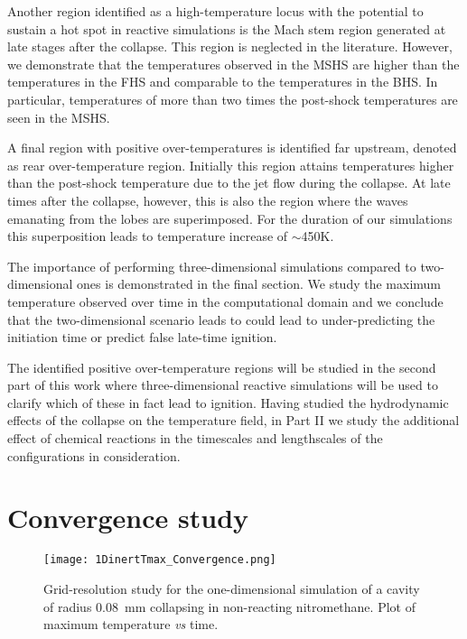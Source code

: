\documentclass[3p,times,twocolumn]{elsarticle}
\begin{document}
Another region identified as a high-temperature locus with the potential to sustain a hot spot in reactive simulations is the Mach stem region generated at late stages after the collapse.  This region is neglected in the literature. However, we demonstrate that the temperatures observed in the MSHS are higher than the temperatures in the FHS and comparable to the temperatures in the BHS. In particular, temperatures of more than two times the post-shock temperatures are seen in the MSHS. 

A final region with positive over-temperatures is identified far upstream, denoted as rear over-temperature region. Initially this region attains temperatures higher than the post-shock temperature due to the jet flow during the collapse. At late times after the collapse, however, this is also the region where the waves emanating from the lobes are superimposed. For the duration of our simulations this superposition leads to temperature increase of $\sim$450K.

The importance of performing three-dimensional simulations compared to two-dimensional ones is demonstrated in the final section. We study the maximum temperature observed over time in the computational domain and we conclude that the two-dimensional scenario leads to could lead to under-predicting the initiation time or predict false late-time ignition.

The identified positive over-temperature regions will be studied in the second part of this work where three-dimensional reactive simulations will be used to clarify which of these in fact lead to ignition. Having studied the hydrodynamic effects of the collapse on the temperature field, in Part II we study the additional effect of chemical reactions in the timescales and lengthscales of the configurations in consideration.

\appendix
\section{Convergence study}
\label{appendixA}
\begin{figure}[!t]
\centering
\texttt{[image: 1DinertTmax\_Convergence.png]}
\caption{Grid-resolution study for the one-dimensional simulation of a cavity
of radius \SI{0.08}{\milli \meter} collapsing in non-reacting nitromethane.
Plot of maximum
temperature \emph{vs} time.}
\label{conv1D}
\end{figure}
\end{document}
